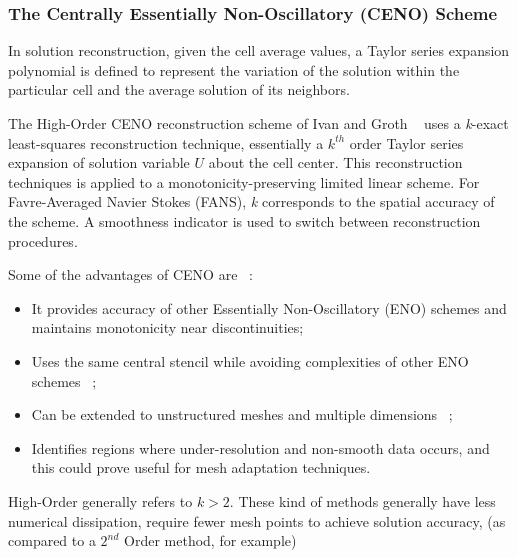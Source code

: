 \subsubsection{The Centrally Essentially Non-Oscillatory (CENO) Scheme}
\label{section:CENO}
In solution reconstruction, given the cell average values, a Taylor series expansion polynomial is defined to represent the variation of the solution within the particular cell and the average solution of its neighbors. \par
The High-Order CENO reconstruction scheme of Ivan and Groth ~\cite{Ivan:2013} uses a \textit{k}-exact least-squares reconstruction technique, essentially a $k^{th}$ order Taylor series expansion of solution variable $U$ about the cell center. This reconstruction techniques is applied to a monotonicity-preserving limited linear scheme. For Favre-Averaged Navier Stokes (FANS), \textit{k} corresponds to the spatial accuracy of the scheme. A smoothness indicator is used to switch between reconstruction procedures.\par
Some of the advantages of CENO are ~\cite{Groth:2013}:
\begin{itemize}
\item It provides accuracy of other Essentially Non-Oscillatory (ENO) schemes and maintains monotonicity near discontinuities;
\item Uses the same central stencil while avoiding complexities of other ENO schemes ~\cite{Ivan:2013};
\item Can be extended to unstructured meshes and multiple dimensions ~\cite{Charest:2013}; 
\item Identifies regions where under-resolution and non-smooth data occurs, and this could prove useful for mesh adaptation techniques.
\end{itemize}

High-Order generally refers to $k>2$. These kind of methods generally have less numerical dissipation, require fewer mesh points to achieve solution accuracy, (as compared to a $2^{nd}$ Order method, for example)